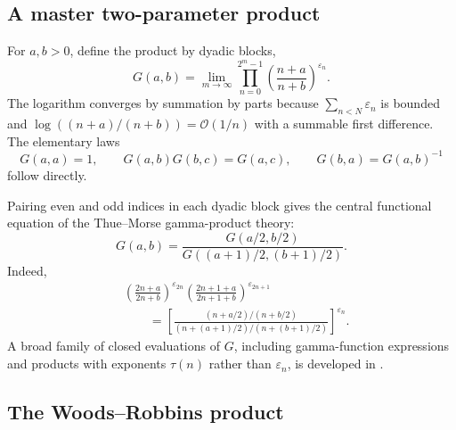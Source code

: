 \documentclass[11pt,oneside]{article}
\theoremstyle{definition}
\theoremstyle{remark}
\newcommand{\bigO}{\mathcal O}
\newcommand{\eps}{\varepsilon}
\begin{document}
\subsection{A master two-parameter product}

For \(a,b>0\), define the product by dyadic blocks,
\begin{equation}
  G(a,b)=\lim_{m\to\infty}
   \prod_{n=0}^{2^m-1}
   \left(\frac{n+a}{n+b}\right)^{\eps_n}.
  \label{eq:G-definition}
\end{equation}
The logarithm converges by summation by parts because
\(\sum_{n<N}\eps_n\) is bounded and
\(\log((n+a)/(n+b))=\bigO(1/n)\) with a summable first difference.
The elementary laws
\begin{equation}
  G(a,a)=1,
  \qquad
  G(a,b)G(b,c)=G(a,c),
  \qquad
  G(b,a)=G(a,b)^{-1}
  \label{eq:G-cocycle}
\end{equation}
follow directly.

Pairing even and odd indices in each dyadic block gives the central functional
equation of the Thue--Morse gamma-product theory:
\begin{equation}
  \boxed{
  G(a,b)=
  \frac{G(a/2,b/2)}
       {G((a+1)/2,(b+1)/2)}.}
  \label{eq:G-functional}
\end{equation}
Indeed,
\begin{align*}
 &\left(\frac{2n+a}{2n+b}\right)^{\eps_{2n}}
 \left(\frac{2n+1+a}{2n+1+b}\right)^{\eps_{2n+1}}\\
 &\qquad=
 \left[
  \frac{(n+a/2)/(n+b/2)}
       {(n+(a+1)/2)/(n+(b+1)/2)}
 \right]^{\eps_n}.
\end{align*}
A broad family of closed evaluations of \(G\), including gamma-function
expressions and products with exponents \(\tau(n)\) rather than \(\eps_n\),
is developed in \cite{alloucheRiasatShallit}.

\subsection{The Woods--Robbins product}
\end{document}
